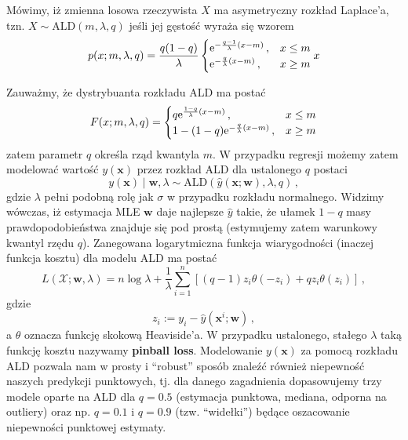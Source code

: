 \documentclass{myclass}
\numberwithin{equation}{section}
\begin{document}
\begin{definition}
Mówimy, iż zmienna losowa rzeczywista \(X\) ma asymetryczny rozkład Laplace'a, tzn. \(X \sim
\mathrm{ALD}(m, \lambda, q)\) jeśli jej gęstość wyraża się wzorem
\begin{equation*}
    p(x; m,\lambda,q) = \frac{q(1-q)}{\lambda}\begin{cases}
        \mathrm{e}^{-\frac{q-1}{\lambda} (x - m)}\,,&x \leq m\\
        \mathrm{e}^{-\frac{q}{\lambda} (x - m)}\,,&x \geq m
    \end{cases}x
\end{equation*}
\end{definition}
Zauważmy, że dystrybuanta rozkładu ALD ma postać
\begin{equation}
    F(x; m,\lambda,q) = \begin{cases}
        q \mathrm{e}^{\frac{1-q}{\lambda}(x - m)}\,,&x \leq m\\
        1 - (1-q)\mathrm{e}^{-\frac{q}{\lambda}(x - m)}\,,&x \geq m
    \end{cases}
\end{equation}
zatem parametr \(q\) określa rząd kwantyla \(m\). W przypadku regresji możemy zatem modelować
wartość \(y(\mathbf{x})\) przez rozkład ALD dla ustalonego \(q\) postaci
\begin{equation}
    y(\mathbf{x}) \mid \mathbf{w}, \lambda \sim \mathrm{ALD}(\hat{y}(\mathbf{x}; \mathbf{w}), \lambda, q)\,,
\end{equation}
gdzie \(\lambda\) pełni podobną rolę jak \(\sigma\) w przypadku rozkładu normalnego. Widzimy
wówczas, iż estymacja MLE \(\mathbf{w}\) daje najlepsze \(\hat{y}\) takie, że ułamek \(1-q\) masy
prawdopodobieństwa znajduje się pod prostą (estymujemy zatem warunkowy kwantyl rzędu \(q\)).
Zanegowana logarytmiczna funkcja wiarygodności (inaczej funkcja kosztu) dla modelu ALD ma postać
\begin{equation}\boxed{
    L(\mathcal{X}; \mathbf{w}, \lambda) = n \log \lambda + \frac{1}{\lambda}\sum_{i=1}^n \left[(q-1)z_i\theta(-z_i) + qz_i\theta(z_i)\right]\,,
}\end{equation}
gdzie
\begin{equation}
    z_i := y_i - \hat{y}(\mathbf{x}^i;\mathbf{w})\,,
\end{equation}
a \(\theta\) oznacza funkcję skokową Heaviside'a. W przypadku ustalonego, stałego \(\lambda\) taką
funkcję kosztu nazywamy \textbf{pinball loss}. Modelowanie \(y(\mathbf{x})\) za pomocą rozkładu ALD
pozwala nam w prosty i \enquote{robust} sposób znaleźć również niepewność naszych predykcji
punktowych, tj. dla danego zagadnienia dopasowujemy trzy modele oparte na ALD dla \(q = 0.5\)
(estymacja punktowa, mediana, odporna na outliery) oraz np. \(q = 0.1\) i \(q = 0.9\) (tzw.
\enquote{widełki}) będące oszacowanie niepewności punktowej estymaty. 
\end{document}
